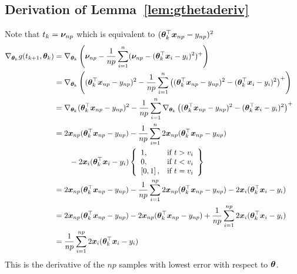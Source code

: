 \documentclass{article} %
\begin{document}
\begin{appendices}
	\subsection{Derivation of Lemma~\ref{lem:gthetaderiv}}
	\label{app:gthetaderiv}
		Note that $t_k = {\bm{\nu}}_{np}$ which is equivalent to $({\bm{\theta}}_k^\top{\bm{x}}_{np} - y_{np})^2$
		\begin{align*}
			\nabla_{{\bm{\theta}}_k} g(t_{k+1},{\bm{\theta}}_k) &= \nabla_{{\bm{\theta}}_k}\left({\bm{\nu}}_{np} - \frac{1}{np}\sum_{i=1}^n({\bm{\nu}}_{np} - ({\bm{\theta}}_k^\top{\bm{x}}_i - y_i)^2)^+\right) &&\\
			&= \nabla_{{\bm{\theta}}_k}\left(({\bm{\theta}}_k^\top{\bm{x}}_{np}-y_{np})^2 - \frac{1}{np}\sum_{i=1}^n\left(({\bm{\theta}}_k^\top{\bm{x}}_{np} - y_{np})^2 - ({\bm{\theta}}_k^\top{\bm{x}}_i - y_i)^2\right)^+\right) &&\\
			&= \nabla_{{\bm{\theta}}_k}({\bm{\theta}}_k^\top{\bm{x}}_{np}-y_{np})^2 - \frac{1}{np}\sum_{i=1}^n\nabla_{{\bm{\theta}}_k}\left(({\bm{\theta}}_k^\top{\bm{x}}_{np} - y_{np})^2 - ({\bm{\theta}}_k^\top{\bm{x}}_i - y_i)^2\right)^+ &&\\				
			&= 2{\bm{x}}_{np}({\bm{\theta}}_k^\top{\bm{x}}_{np} - y_{np}) -\frac{1}{np}\sum_{i=1}^{n}2{\bm{x}}_{np}({\bm{\theta}}_k^\top{\bm{x}}_{np} - y_{np}) \notag\\ &\qquad-2{\bm{x}}_i({\bm{\theta}}_k^\top{\bm{x}}_i - y_i) \left\{
			\begin{array}{lr}
				1, & \text{if } t > v_i\\
				0, & \text{if } t < v_i \\
				\left[0,1\right], & \text{if } t = v_i \\
			\end{array} \right\} &&\\
			&= 2{\bm{x}}_{np}({\bm{\theta}}_k^\top{\bm{x}}_{np} - y_{np}) -\frac{1}{np}\sum_{i=1}^{np}2{\bm{x}}_{np}({\bm{\theta}}_k^\top{\bm{x}}_{np} - y_{np}) -2{\bm{x}}_i({\bm{\theta}}_k^\top{\bm{x}}_i - y_i) &&\\	
			&= 2{\bm{x}}_{np}({\bm{\theta}}_k^\top{\bm{x}}_{np} - y_{np}) - 2{\bm{x}}_{np}({\bm{\theta}}_k^\top{\bm{x}}_{np} - y_{np}) + \frac{1}{np}\sum_{i=1}^{np}2{\bm{x}}_i({\bm{\theta}}_k^\top{\bm{x}}_i - y_i) &&\\
			&= \frac{1}{np}\sum_{i=1}^{np}2{\bm{x}}_i({\bm{\theta}}_k^\top{\bm{x}}_i - y_i)&&
		\end{align*}
		This is the derivative of the $np$ samples with lowest error with respect to ${\bm{\theta}}$.


\end{appendices}
\end{document}
